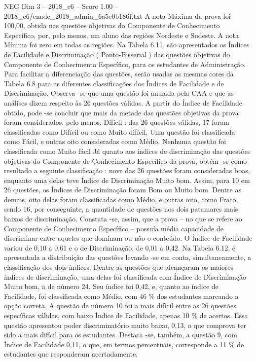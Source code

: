 \begin{textsample}{NEG Dim 3 – 2018\_c6 – Score 1.00 – 2018\_c6/enade\_2018\_admin\_6a5e0b186f.txt}
A nota Máxima da prova foi 100,00, obtida nas questões objetivas do Componente de Conhecimento Específico, por, pelo menos, um aluno das regiões Nordeste e Sudeste.
A nota Mínima foi zero em todas as regiões.
Na Tabela 6.11, são apresentados os Índices de Facilidade e Discriminação ( Ponto-Bisserial ) das questões objetivas do Componente de Conhecimento Específico, para os estudantes de Administração.
Para facilitar a diferenciação das questões, serão usadas as mesmas cores da Tabela 6.8 para as diferentes classificações dos Índices de Facilidade e de Discriminação.
Observa -se que uma questão foi anulada pela CAA e que as análises dizem respeito às 26 questões válidas.
A partir do Índice de Facilidade obtido, pode -se concluir que mais da metade das questões objetivas da prova foram considerados, pelo menos, Difícil : das 26 questões válidas, 17 foram classificadas como Difícil ou como Muito difícil.
Uma questão foi classificada como Fácil, e outras oito consideradas como Médio.
Nenhuma questão foi classificada como Muito fácil Já quanto aos índices de discriminação das questões objetivas do Componente de Conhecimento Específico da prova, obtém -se como resultado a seguinte classificação : nove das 26 questões foram consideradas boas, enquanto uma delas teve Índice de Discriminação Muito bom.
Assim, para 10 em 26 questões, os Índices de Discriminação foram Bom ou Muito bom.
Dentre as demais, oito delas foram classificadas como Médio, e outras oito, como Fraco, sendo 16, por conseguinte, a quantidade de questões nos dois patamares mais baixos de discriminação.
Constata -se, assim, que a prova – no que se refere ao Componente de Conhecimento Específico – possuía média capacidade de discriminar entre aqueles que dominam ou não o conteúdo.
O Índice de Facilidade variou de 0,10 a 0,61 e o de Discriminação, de 0,01 a 0,42.
Na Tabela 6.12, é apresentada a distribuição das questões levando -se em conta, simultaneamente, a classificação dos dois índices.
Dentre as questões que alcançaram os maiores índices de discriminação, uma delas foi classificada com Índice de Discriminação Muito bom, a de número 24.
Seu índice foi 0,42, e, quanto ao índice de Facilidade, foi classificada como Médio, com 46 \% dos estudantes marcando a opção correta.
A questão de número 10 foi a mais difícil entre as 26 questões específicas válidas, com baixo Índice de Facilidade, apenas 10 \% de acertos.
Essa questão apresentou poder discriminatório muito baixo, 0,13, o que comprova ter sido a mais difícil para os estudantes.
Destaca -se, também, a questão 9, com Índice de Facilidade 0,11, o que, em termos percentuais, corresponde a 11 \% de estudantes que responderam acertadamente.

\end{textsample}
